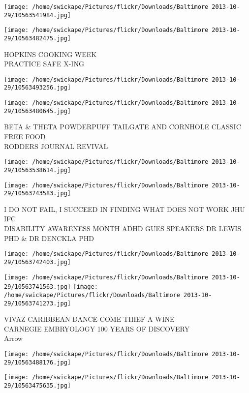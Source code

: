 \documentclass[10pt,letterpaper]{article}
\begin{document}
\texttt{[image: /home/swickape/Pictures/flickr/Downloads/Baltimore 2013-10-29/10563541984.jpg]}

\vspace{0.25in}
\texttt{[image: /home/swickape/Pictures/flickr/Downloads/Baltimore 2013-10-29/10563482475.jpg]}

HOPKINS COOKING WEEK\\
PRACTICE SAFE X{-}ING
\pagebreak

\texttt{[image: /home/swickape/Pictures/flickr/Downloads/Baltimore 2013-10-29/10563493256.jpg]}

\vspace{0.25in}
\texttt{[image: /home/swickape/Pictures/flickr/Downloads/Baltimore 2013-10-29/10563480645.jpg]}

BETA \& THETA POWDERPUFF TAILGATE AND CORNHOLE CLASSIC FREE FOOD\\
RODDERS JOURNAL REVIVAL
\pagebreak

\texttt{[image: /home/swickape/Pictures/flickr/Downloads/Baltimore 2013-10-29/10563538614.jpg]}

\vspace{0.25in}
\texttt{[image: /home/swickape/Pictures/flickr/Downloads/Baltimore 2013-10-29/10563743583.jpg]}

I DO NOT FAIL, I SUCCEED IN FINDING WHAT DOES NOT WORK JHU IFC\\
DISABILITY AWARENESS MONTH ADHD GUES SPEAKERS DR LEWIS PHD \& DR DENCKLA PHD
\pagebreak

\texttt{[image: /home/swickape/Pictures/flickr/Downloads/Baltimore 2013-10-29/10563742403.jpg]}

\vspace{0.25in}
\texttt{[image: /home/swickape/Pictures/flickr/Downloads/Baltimore 2013-10-29/10563741563.jpg]}
\texttt{[image: /home/swickape/Pictures/flickr/Downloads/Baltimore 2013-10-29/10563741273.jpg]}

VIVAZ CARIBBEAN DANCE COME THIEF A WINE\\
CARNEGIE EMBRYOLOGY 100 YEARS OF DISCOVERY\\
Arrow
\pagebreak

\texttt{[image: /home/swickape/Pictures/flickr/Downloads/Baltimore 2013-10-29/10563488176.jpg]}

\vspace{0.25in}
\texttt{[image: /home/swickape/Pictures/flickr/Downloads/Baltimore 2013-10-29/10563475635.jpg]}
\end{document}
